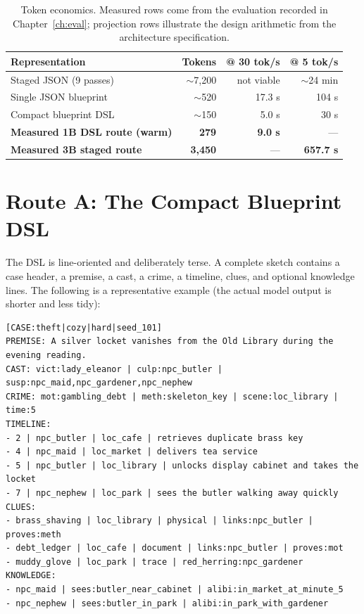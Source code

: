 ﻿\documentclass[11pt,a4paper]{report}
\begin{document}
\begin{table}[htbp]
  \centering
  \small
  \begin{tabular}{@{}lrrr@{}}
    \toprule
    \textbf{Representation} & \textbf{Tokens} & \textbf{@ 30 tok/s} & \textbf{@ 5 tok/s} \\
    \midrule
    Staged JSON (9 passes) & $\sim$7{,}200 & not viable & $\sim$24 min \\
    Single JSON blueprint & $\sim$520 & 17.3 s & 104 s \\
    Compact blueprint DSL & $\sim$150 & 5.0 s & 30 s \\
    \midrule
    \textbf{Measured 1B DSL route (warm)} & \textbf{279} & \textbf{9.0 s} & --- \\
    \textbf{Measured 3B staged route} & \textbf{3{,}450} & --- & \textbf{657.7 s} \\
    \bottomrule
  \end{tabular}
  \caption{Token economics. Measured rows come from the evaluation recorded in Chapter~\ref{ch:eval}; projection rows illustrate the design arithmetic from the architecture specification.}
  \label{tab:tokens}
\end{table}

\section{Route A: The Compact Blueprint DSL}
The DSL is line-oriented and deliberately terse. A complete sketch contains a case header, a premise, a cast, a crime, a timeline, clues, and optional knowledge lines. The following is a representative example (the actual model output is shorter and less tidy):

\begin{lstlisting}[style=dsl]
[CASE:theft|cozy|hard|seed_101]
PREMISE: A silver locket vanishes from the Old Library during the evening reading.
CAST: vict:lady_eleanor | culp:npc_butler | susp:npc_maid,npc_gardener,npc_nephew
CRIME: mot:gambling_debt | meth:skeleton_key | scene:loc_library | time:5
TIMELINE:
- 2 | npc_butler | loc_cafe | retrieves duplicate brass key
- 4 | npc_maid | loc_market | delivers tea service
- 5 | npc_butler | loc_library | unlocks display cabinet and takes the locket
- 7 | npc_nephew | loc_park | sees the butler walking away quickly
CLUES:
- brass_shaving | loc_library | physical | links:npc_butler | proves:meth
- debt_ledger | loc_cafe | document | links:npc_butler | proves:mot
- muddy_glove | loc_park | trace | red_herring:npc_gardener
KNOWLEDGE:
- npc_maid | sees:butler_near_cabinet | alibi:in_market_at_minute_5
- npc_nephew | sees:butler_in_park | alibi:in_park_with_gardener
\end{lstlisting}
\end{document}
